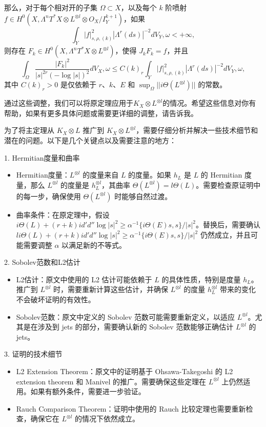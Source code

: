 \documentclass[lang=cn,12pt,fontset=none,a4paper]{beautybook}
\begin{document}
那么，对于每个相对开的子集 $\Omega \subset X$，以及每个 $k$ 阶喷射 $f \in H^0(X, \Lambda^n T^* X \otimes L^{\otimes l} \otimes O_X / I^{k+1}_Y)$，如果
$$ \int_Y |f|^2_{s, \rho, (k)} |Λ^r(ds)|^{-2} dV_Y, \omega < +∞, $$
则存在 \(F_k \in H^0(X, \Lambda^n T^* X \otimes L^{\otimes l})\)，使得 \(J_k F_k = f\)，并且
$$ \int_\Omega \frac{|F_k|^2}{|s|^{2r} (-\log |s|)^2} dV_X, \omega \leq C(k)_r \int_Y |f|^2_{s, \rho, (k)} |Λ^r(ds)|^{-2} dV_Y, \omega, $$
其中 \(C(k)_r > 0\) 是仅依赖于 $r$、$k$、$E$ 和 $\sup_\Omega ||i\Theta(L^{\otimes l})||$ 的常数。

通过这些调整，我们可以将原定理应用于$K_X\otimes L^{\otimes l}$的情况。希望这些信息对你有帮助，如果有更多具体问题或需要更详细的调整，请告诉我。


为了将主定理从 $K_X \otimes L$ 推广到 $K_X \otimes L^{\otimes l}$，需要仔细分析并解决一些技术细节和潜在的问题。以下是几个关键点以及需要注意的地方：

1. Hermitian度量和曲率
\begin{itemize}
  \item Hermitian度量：$L^{\otimes l}$ 的度量来自 $L$ 的度量。如果 $h_L$ 是 $L$ 的 Hermitian 度量，那么 $L^{\otimes l}$ 的度量是 $h_L^{\otimes l}$，其曲率 $\Theta(L^{\otimes l}) = l\Theta(L)$。需要检查原证明中的每一步，确保使用 $\Theta(L^{\otimes l})$ 时能够自然过渡。
  \item 曲率条件：在原定理中，假设 $i\Theta(L) + (r + k) id'd'' \log |s|^2 \geq α^{-1} \{i\Theta(E)s, s\}/|s|^2$。替换后，需要确认 $li\Theta(L) + (r + k) id'd'' \log |s|^2 \geq α^{-1} \{i\Theta(E)s, s\}/|s|^2$ 仍然成立，并且可能需要调整 $α$ 以满足新的不等式。
\end{itemize}

2. Sobolev范数和L2估计

\begin{itemize}
      \item L2估计：原文中使用的 L2 估计可能依赖于 $L$ 的具体性质，特别是度量 $h_L$。推广到 $L^{\otimes l}$ 时，需要重新计算这些估计，并确保 $L^{\otimes l}$ 的度量 $h_L^{\otimes l}$ 带来的变化不会破坏证明的有效性。
      
      \item Sobolev范数：原文中定义的 Sobolev 范数可能需要重新定义，以适应 $L^{\otimes l}$。尤其是在涉及到 jets 的部分，需要确认新的 Sobolev 范数能够正确估计 $L^{\otimes l}$ 的 jets。
\end{itemize}
   

3. 证明的技术细节

\begin{itemize}
      \item L2 Extension Theorem：原文中的证明基于 Ohsawa-Takegoshi 的 L2 extension theorem 和 Manivel 的推广。需要确保这些定理在 $L^{\otimes l}$ 上仍然适用。如果有额外条件，需要进一步验证。
      
      \item Rauch Comparison Theorem：证明中使用的 Rauch 比较定理也需要重新检查，确保它在 $L^{\otimes l}$ 的情况下依然成立。
\end{itemize}
   
\end{document}
